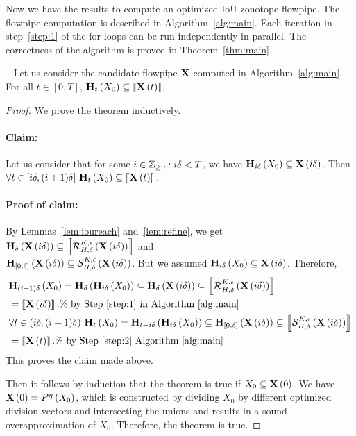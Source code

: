 Now we have the results to compute an optimized IoU zonotope flowpipe.
The flowpipe computation is described in Algorithm~\ref{alg:main}.
Each iteration in step~\ref{step:1} of the for loops can be run independently
in parallel.  The correctness of the algorithm is proved in
Theorem~\ref{thm:main}.
%
\begin{theorem}~\label{thm:main}
Let us consider the candidate flowpipe $\mathbf{X}$ computed in
Algorithm~\ref{alg:main}.  For all $t\in[0,T]$,
$\mathbf{H}_{t}\left(X_0\right)\subseteq \left\llbracket{\mathbf{X}\left(t\right)}\right\rrbracket$.
\end{theorem}
%
\begin{proof}
We prove the theorem inductively.

\paragraph{Claim:}  Let us consider that for some
$i\in\mathbb{Z}_{\geq 0}:i\delta<T$, we have
$\mathbf{H}_{i\delta}\left(X_0\right)\subseteq\mathbf{X}\left(i\delta\right)$.  Then $\forall
t\in[i\delta,(i+1)\delta]~\mathbf{H}_{t}\left(X_0\right)\subseteq \left\llbracket{\mathbf{X}\left(t\right)}\right\rrbracket$.

\paragraph{Proof of claim:}
By Lemmas~\ref{lem:ioureach} and~\ref{lem:refine}, we get
$\mathbf{H}_{\delta}\left(\mathbf{X}\left(i\delta\right)\right)\subseteq \left\llbracket{\mathcal{R}_{H,\delta}^{K,\epsilon}\left(\mathbf{X}\left(i\delta\right)\right)}\right\rrbracket$
and\\
$\mathbf{H}_{[0,\delta]}\left(\mathbf{X}\left(i\delta\right)\right)\subseteq \mathcal{S}_{H,\delta}^{K,\epsilon}\left(\mathbf{X}\left(i\delta\right)\right)$.
But we assumed $\mathbf{H}_{i\delta}\left(X_0\right)\subseteq \mathbf{X}\left(i\delta\right)$.
Therefore,
%
\begin{align*}
& \reach{H}{(i+1)\delta}{X_0}
= \reach{H}{\delta}{\reach{H}{i\delta}{X_0}} \subseteq \reach{H}{\delta}{\tr{X}{i\delta}}
\subseteq \ztset{\flow{H}{\delta}{K}{\epsilon}{\tr{X}{i\delta}}}\\
& = \ztset{\tr{X}{i\delta}}.\%~\text{by Step~\ref{step:1} in Algorithm~\ref{alg:main}}\\
%
& \forall t\in(i\delta,(i+1)\delta)~\reach{H}{t}{X_0}
= \reach{H}{t-i\delta}{\reach{H}{i\delta}{X_0}} \subseteq \reach{H}{[0,\delta]}{\tr{X}{i\delta}}
\subseteq \ztset{\ivflow{H}{\delta}{K}{\epsilon}{\tr{X}{i\delta}}}\\
& = \ztset{\tr{X}{t}}. \%~\text{by Step~\ref{step:2} Algorithm~\ref{alg:main}}
\end{align*}
%
This proves the claim made above.

Then it follows by induction that the theorem is true if
$X_0\subseteq \mathbf{X}\left(0\right)$.  We have $\mathbf{X}\left(0\right) = P^{\eta}\left(X_0\right)$,
which is constructed by dividing $X_0$ by different optimized division
vectors and intersecting the unions and results in a sound
overapproximation of $X_0$.  Therefore, the theorem is true.
\end{proof}

